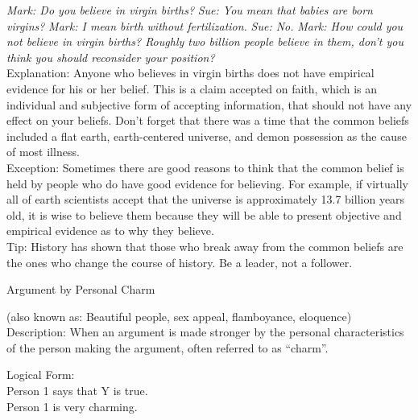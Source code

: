 \documentclass[a4paper,12pt,single,pdftex]{scrartcl}
\begin{document}
{    
      {\em Mark: Do you believe in virgin births?} \newline
{\em Sue: You mean that babies are born virgins?} \newline
{\em Mark: I mean birth without fertilization.} \newline
{\em Sue: No.} \newline
{\em Mark: How could you not believe in virgin births? Roughly two billion people believe in them, don’t you think you should reconsider your position?}
    \\

    
      Explanation: Anyone who believes in virgin births does not have empirical evidence for his or her belief.  This is a claim accepted on faith, which is an individual and subjective form of accepting information, that should not have any effect on your beliefs.  Don’t forget that there was a time that the common beliefs included a flat earth, earth-centered universe, and demon possession as the cause of most illness.
    \\

    
      Exception: Sometimes there are good reasons to think that the common belief is held by people who do have good evidence for believing.  For example, if virtually all of earth scientists accept that the universe is approximately 13.7 billion years old, it is wise to believe them because they will be able to present objective and empirical evidence as to why they believe.
    \\

    
      Tip: History has shown that those who break away from the common beliefs are the ones who change the course of history.  Be a leader, not a follower.
    \\

  }


Argument by Personal Charm
    
      (also known as: Beautiful people, sex appeal, flamboyance, eloquence)
    \\

  
    Description: When an argument is made stronger by the personal characteristics of the person making the argument, often referred to as “charm”.

    
      Logical Form:
    \\

    
      Person 1 says that Y is true.
    \\

    
      Person 1 is very charming.
    \\
\end{document}
